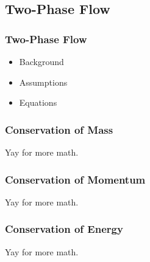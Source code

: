 \documentclass[compress]{beamer}
\begin{document}
\subsection[Two-Phase Flow]{Two-Phase Flow}
\begin{frame}
\frametitle{Two-Phase Flow}

\begin{itemize}
\item{Background}
\item{Assumptions}
\item{Equations}
\end{itemize}

\end{frame}
\begin{frame}
\frametitle{Conservation of Mass}

Yay for more math.

\end{frame}
\begin{frame}
\frametitle{Conservation of Momentum}

Yay for more math.

\end{frame}
\begin{frame}
\frametitle{Conservation of Energy}

Yay for more math.

\end{frame}
\end{document}
